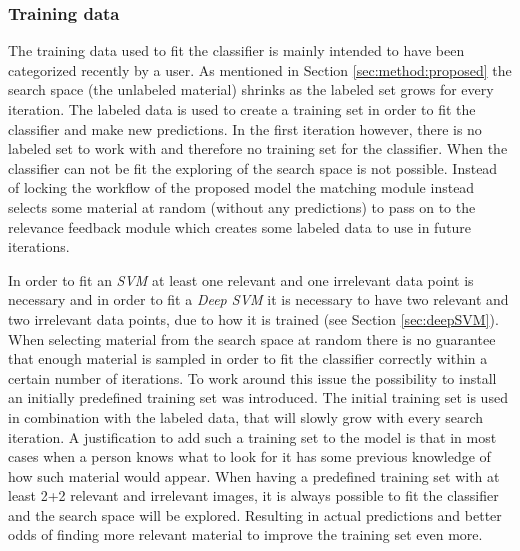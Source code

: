 \subsubsection{Training data}
\label{sec:method:proposed:matching:training}
The training data used to fit the classifier is mainly intended to have been categorized recently by a user. As mentioned in Section \ref{sec:method:proposed} the search space (the  unlabeled material) shrinks as the labeled set grows for every iteration. The labeled data is used to create a training set in order to fit the classifier and make new predictions. 
In the first iteration however, there is no labeled set to work with and therefore no training set for the classifier. When the classifier can not be fit the exploring of the search space is not possible. Instead of locking the workflow of the proposed model the matching module instead selects some material at random (without any predictions) to pass on to the relevance feedback module which creates some labeled data to use in future iterations.

In order to fit an \emph{SVM} at least one relevant and one irrelevant data point is necessary and in order to fit a \emph{Deep SVM} it is necessary to have two relevant and two irrelevant data points, due to how it is trained (see Section \ref{sec:deepSVM}). When selecting material from the search space at random there is no guarantee that enough material is sampled in order to fit the classifier correctly within a certain number of iterations. 
To work around this issue the possibility to install an initially predefined training set was introduced. The initial training set is used in combination with the labeled data, that will slowly grow with every search iteration. A justification to add such a training set to the model is that in most cases when a person knows what to look for it has some previous knowledge of how such material would appear. When having a predefined training set with at least 2+2 relevant and irrelevant images, it is always possible to fit the classifier and the search space will be explored. Resulting in actual predictions and better odds of finding more relevant material to improve the training set even more.

